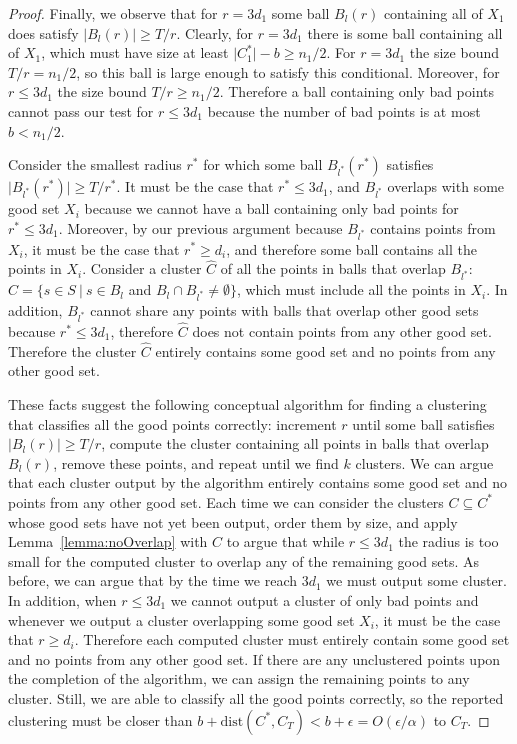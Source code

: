 \documentclass{llncs} \usepackage{algorithm}
\newcommand{\dist}{\mathrm{dist}}
\begin{document}
\begin{proof}
Finally, we observe that for $r = 3d_{1}$ some ball $B_{l}(r)$ containing all of $X_{1}$ does satisfy $\vert B_{l}(r) \vert \ge T/r$.  Clearly, for $r = 3d_{1}$ there is some ball containing all of $X_{1}$, which must have size at least $\vert C_{1}^{\ast} \vert - b \ge n_{1}/2$.  For $r = 3d_{1}$ the size bound $T/r = n_{1}/2$, so this ball is large enough to satisfy this conditional.  Moreover, for $r \le 3d_{1}$ the size bound $T/r \ge n_{1}/2$.  Therefore a ball containing only bad points cannot pass our test for $r \le 3d_{1}$ because the number of bad points is at most $b < n_{1}/2$.

Consider the smallest radius $r^{\ast}$ for which some ball $B_{l^{\ast}}(r^{\ast})$ satisfies $\vert B_{l^{\ast}}(r^{\ast}) \vert \ge T / r^{\ast}$.  It must be the case that $r^{\ast} \le 3d_{1}$, and $B_{l^{\ast}}$ overlaps with some good set $X_{i}$ because we cannot have a ball containing only bad points for $r^{\ast} \le 3d_{1}$.  Moreover, by our previous argument because $B_{l^{\ast}}$ contains points from $X_{i}$, it must be the case that $r^{\ast} \ge d_{i}$, and therefore some ball contains all the points in $X_{i}$.  Consider a cluster $\hat{C}$ of all the points in balls that overlap $B_{l^{\ast}}$: $\hat{C} = \lbrace s \in S \ \vert \ s \in B_{l}$ and $B_{l} \cap B_{l^{\ast}} \ne \emptyset \rbrace$, which must include all the points in $X_{i}$.  In addition, $B_{l^{\ast}}$ cannot share any points with balls that overlap other good sets because $r^{\ast} \le 3d_{1}$, therefore $\hat{C}$ does not contain points from any other good set.  Therefore the cluster $\hat{C}$ entirely contains some good set and no points from any other good set.

These facts suggest the following conceptual algorithm for finding a clustering that classifies all the good points correctly: increment $r$ until some ball satisfies $\vert B_{l}(r) \vert \ge T / r$, compute the cluster containing all points in balls that overlap $B_{l}(r)$, remove these points, and repeat until we find $k$ clusters.  We can argue that each cluster output by the algorithm entirely contains some good set and no points from any other good set.  Each time we can consider the clusters $C \subseteq C^{\ast}$ whose good sets have not yet been output, order them by size, and apply Lemma~\ref{lemma:noOverlap} with $C$ to argue that while $r \le 3d_{1}$ the radius is too small for the computed cluster to overlap any of the remaining good sets.  As before, we can argue that by the time we reach $3d_{1}$ we must output some cluster.  In addition, when $r \le 3d_{1}$ we cannot output a cluster of only bad points and whenever we output a cluster overlapping some good set $X_{i}$, it must be the case that $r \ge d_{i}$.  Therefore each computed cluster must entirely contain some good set and no points from any other good set.  If there are any unclustered points upon the completion of the algorithm, we can assign the remaining points to any cluster.  Still, we are able to classify all the good points correctly, so the reported clustering must be closer than $b + \dist(C^{\ast},C_{T}) < b + \epsilon = O(\epsilon/\alpha)$ to $C_{T}$.


\end{proof}
\end{document}
